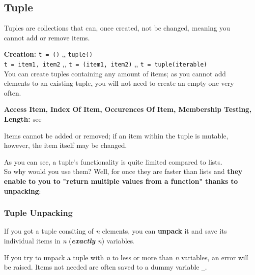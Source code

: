 \subsection{Tuple}

    Tuples are collections that can, once created, not be changed, meaning you
    cannot add or remove items.

    \begin{indentblock}

        \textbf{Creation:} \texttt{t = ()} \sep{,} \texttt{tuple()} \\
        \texttt{t = item1, item2} \sep{,}
        \texttt{t = (item1, item2)} \sep{,}
        \texttt{t = tuple(iterable)} \\
        You can create tuples containing any amount of items; as you cannot add elements to an
        existing tuple, you will not need to create an empty one very often.

        \textbf{Access Item, Index Of Item, Occurences Of Item, Membership Testing, Length:}
        see 

        Items cannot be added or removed; if an item within the tuple is mutable, however,
        the item itself may be changed.

    \end{indentblock}

    As you can see, a tuple's functionality is quite limited compared to lists. \\
    So why would you use them? Well, for once they are faster than lists and
    \textbf{they enable to you to "return multiple values from a function" thanks to unpacking}:

    \subsubsection{Tuple Unpacking}

        If you got a tuple consiting of \textit{n} elements, you can \textbf{unpack} it and save
        its individual items in \textit{n} (\textit{\textbf{exactly} n}) variables.


        If you try to unpack a tuple with \textit{n} to less or more than \textit{n} variables,
        an error will be raised. Items not needed are often saved to a dummy variable \texttt{\_}.


